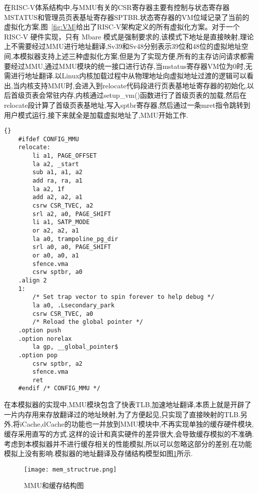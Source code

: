 在RISC-V体系结构中,与MMU有关的CSR寄存器主要有控制与状态寄存器MSTATUS和管理员页表基址寄存器SPTBR.状态寄存器的VM位域记录了当前的虚拟化方案,图~\ref{fig:VM}给出了RISC-V架构定义的所有虚拟化方案。对于一个 RISC-V 硬件实现，只有 Mbare 模式是强制要求的,该模式下地址是直接映射,理论上不需要经过MMU进行地址翻译,Sv39和Sv48分别表示39位和48位的虚拟地址空间,本模拟器支持上述三种虚拟化方案,但是为了实现方便,所有的主存访问请求都需要经过MMU,通过MMU模块的统一接口进行访存,当mstatus寄存器VM位为0时,无需进行地址翻译.以Linux内核加载过程中从物理地址向虚拟地址过渡的逻辑可以看出,当内核支持MMU时,会进入到relocate代码段进行页表基地址寄存器的初始化,以后首级页表会常驻内存,内核通过setup\_vm()函数进行了首级页表的加载,然后在relocate段计算了首级页表基地址,写入sptbr寄存器,然后通过一条mret指令跳转到用户模式运行,接下来就全是加载虚拟地址了,MMU开始工作.
\begin{lstlisting}{}
    #ifdef CONFIG_MMU
    relocate:
        li a1, PAGE_OFFSET
        la a2, _start
        sub a1, a1, a2
        add ra, ra, a1
        la a2, 1f
        add a2, a2, a1
        csrw CSR_TVEC, a2
        srl a2, a0, PAGE_SHIFT
        li a1, SATP_MODE
        or a2, a2, a1
        la a0, trampoline_pg_dir
        srl a0, a0, PAGE_SHIFT
        or a0, a0, a1
        sfence.vma
        csrw sptbr, a0
    .align 2
    1:
        /* Set trap vector to spin forever to help debug */
        la a0, .Lsecondary_park
        csrw CSR_TVEC, a0
        /* Reload the global pointer */
    .option push
    .option norelax
        la gp, __global_pointer$
    .option pop
        csrw sptbr, a2
        sfence.vma
        ret
    #endif /* CONFIG_MMU */    
\end{lstlisting}


在本模拟器的实现中,MMU模块包含了快表TLB,加速地址翻译,本质上就是开辟了一片内存用来存放翻译过的地址映射,为了方便起见,只实现了直接映射的TLB.另外,将iCache,dCache的功能也一并放到MMU模块中,不再实现单独的缓存硬件模块,缓存采用直写的方式.这样的设计和真实硬件的差异很大,会导致缓存模拟的不准确.考虑到本模拟器并不进行缓存相关的性能模拟,所以可以忽略这部分的差别,在功能模拟上没有影响.模拟器的地址翻译及存储结构模型如图\ref{fig:mem_structrue}所示.
\begin{figure}[h]
    \centering
    \texttt{[image: mem\_structrue.png]}
    \caption{MMU和缓存结构图}
    \label{fig:mem_structrue}
\end{figure}


